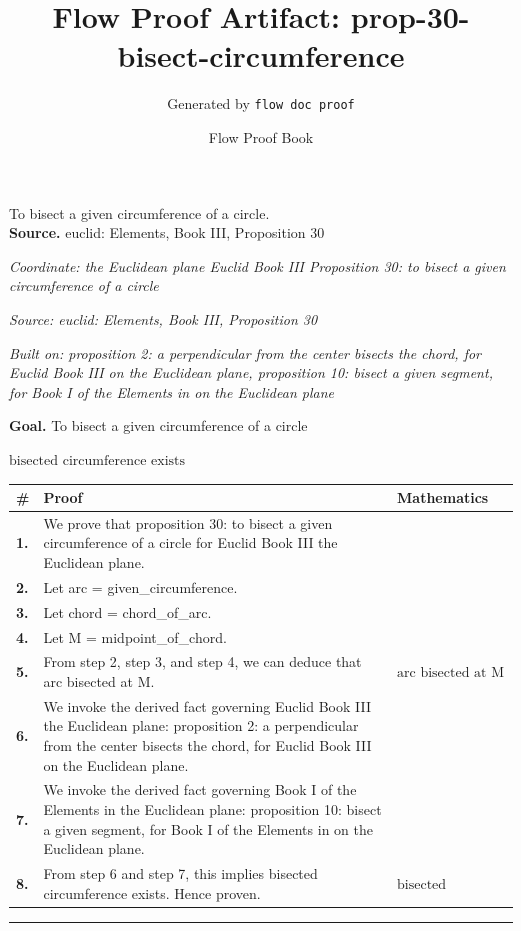 \documentclass[11pt]{article}
\title{Flow Proof Artifact: prop-30-bisect-circumference}
\author{Generated by \texttt{flow doc proof}}
\date{Flow Proof Book}
\theoremstyle{definition}
\begin{document}
\maketitle
To bisect a given circumference of a circle.\\[0.5em]
\textbf{Source.} euclid: Elements, Book III, Proposition 30\\[0.5em]
\bigskip
{}\par
\smallskip\noindent\textit{Coordinate: the Euclidean plane \cdot Euclid Book III \cdot Proposition 30: to bisect a given circumference of a circle}\par
\smallskip\noindent\textit{Source: euclid: Elements, Book III, Proposition 30}\par
\smallskip\noindent\textit{Built on: proposition 2: a perpendicular from the center bisects the chord, for Euclid Book III on the Euclidean plane, proposition 10: bisect a given segment, for Book I of the Elements in on the Euclidean plane}\par
\medskip
\noindent\textbf{Goal.} To bisect a given circumference of a circle\par
\noindent$\displaystyle \text{bisected circumference exists}$\par
\medskip
\noindent
\begin{tabular}{@{} >{\raggedright\arraybackslash}p{} >{\raggedright\arraybackslash}p{} >{\raggedleft\arraybackslash}p{} @{}}
\textbf{\#} & \textbf{Proof} & \textbf{Mathematics} \\
\midrule
\textbf{1.} & We prove that proposition 30: to bisect a given circumference of a circle for Euclid Book III the Euclidean plane. & \\[0.45em]
\textbf{2.} & Let arc = given\_circumference. & \\[0.45em]
\textbf{3.} & Let chord = chord\_of\_arc. & \\[0.45em]
\textbf{4.} & Let M = midpoint\_of\_chord. & \\[0.45em]
\textbf{5.} & From step 2, step 3, and step 4, we can deduce that arc bisected at M. & $\displaystyle \text{arc bisected at M}$ \\[0.45em]
\textbf{6.} & We invoke the derived fact governing Euclid Book III the Euclidean plane: proposition 2: a perpendicular from the center bisects the chord, for Euclid Book III on the Euclidean plane. & \\[0.45em]
\textbf{7.} & We invoke the derived fact governing Book I of the Elements in the Euclidean plane: proposition 10: bisect a given segment, for Book I of the Elements in on the Euclidean plane. & \\[0.45em]
\textbf{8.} & From step 6 and step 7, this implies bisected circumference exists. Hence proven. & $\displaystyle \text{bisected circumference exists}$ \\[0.45em]
\bottomrule
\end{tabular}
\label{thm:Geometry-Euclid Book III-proposition_30_to_bisect_a_given_circumference_of_a_circle}
\par\medskip\hrule
\end{document}
